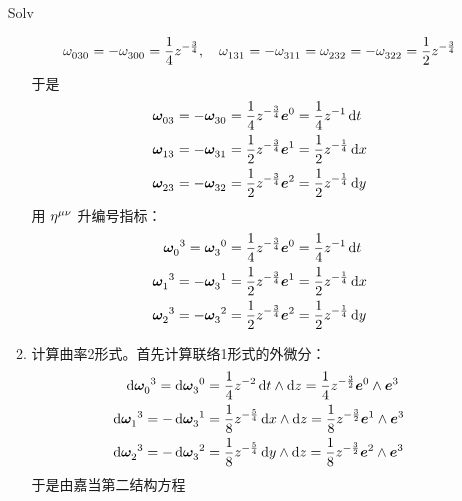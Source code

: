 \begin{xiti}
\begin{jie}
\begin{enumerate}
\begin{yl}{Solv}
\begin{enumerate}[leftmargin=2em]
\begin{displaymath}
	        	    \tensor{\omega}{_0_3_0} = - \tensor{\omega}{_3_0_0} = \frac{1}{4} z^{-\frac{3}{4}} \qc \tensor{\omega}{_1_3_1} = - \tensor{\omega}{_3_1_1} = \tensor{\omega}{_2_3_2} = - \tensor{\omega}{_3_2_2} = \frac{1}{2} z^{-\frac{3}{4}}
	        	    \end{displaymath}
	        	    于是
	        	    \begin{align*}
	        	    \tensor{\bm{\omega}}{_0_3} &= - \tensor{\bm{\omega}}{_3_0} = \frac{1}{4} z^{-\frac{3}{4}} \bm{e}^0 = \frac{1}{4} z^{-1} \dd{t} \\
	        	    \tensor{\bm{\omega}}{_1_3} &= - \tensor{\bm{\omega}}{_3_1} = \frac{1}{2} z^{-\frac{3}{4}} \bm{e}^1 = \frac{1}{2} z^{-\frac{1}{4}} \dd{x} \\
	        	    \tensor{\bm{\omega}}{_2_3} &= - \tensor{\bm{\omega}}{_3_2} = \frac{1}{2} z^{-\frac{3}{4}} \bm{e}^2 = \frac{1}{2} z^{-\frac{1}{4}} \dd{y}
	        	    \end{align*}
	        	    用 $\tensor{\eta}{^\mu^\nu}$ 升编号指标：
	        	    \begin{align*}
	        	    \tensor{\bm{\omega}}{_0^3} =  \tensor{\bm{\omega}}{_3^0} &= \frac{1}{4} z^{-\frac{3}{4}} \bm{e}^0 = \frac{1}{4} z^{-1} \dd{t} \\
	        	    \tensor{\bm{\omega}}{_1^3} = - \tensor{\bm{\omega}}{_3^1} &= \frac{1}{2} z^{-\frac{3}{4}} \bm{e}^1 = \frac{1}{2} z^{-\frac{1}{4}} \dd{x}\\
	        	    \tensor{\bm{\omega}}{_2^3} = - \tensor{\bm{\omega}}{_3^2} &= \frac{1}{2} z^{-\frac{3}{4}} \bm{e}^2 = \frac{1}{2} z^{-\frac{1}{4}} \dd{y}
	        	    \end{align*}
	        	    \item 计算曲率2形式。首先计算联络1形式的外微分：
	        	    \begin{align*}
	        	    \dd{\tensor{\bm{\omega}}{_0^3}} = \dd{\tensor{\bm{\omega}}{_3^0}} &= \frac{1}{4} z^{-2} \dd{t} \wedge \dd{z} = \frac{1}{4} z^{-\frac{3}{2}} \bm{e}^0 \wedge \bm{e}^3 \\
	        	    \dd{\tensor{\bm{\omega}}{_1^3}} = - \dd{\tensor{\bm{\omega}}{_3^1}} &= \frac{1}{8} z^{-\frac{5}{4}} \dd{x} \wedge \dd{z} = \frac{1}{8} z^{-\frac{3}{2}} \bm{e}^1 \wedge \bm{e}^3 \\
	        	    \dd{\tensor{\bm{\omega}}{_2^3}} = - \dd{\tensor{\bm{\omega}}{_3^2}} &= \frac{1}{8} z^{-\frac{5}{4}} \dd{y} \wedge \dd{z} = \frac{1}{8} z^{-\frac{3}{2}} \bm{e}^2 \wedge \bm{e}^3
	        	    \end{align*}
	        	    于是由嘉当第二结构方程

\end{enumerate}
\end{yl}
\end{enumerate}
\end{jie}
\end{xiti}
